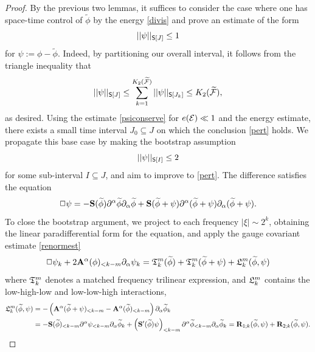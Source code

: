 \begin{proof}
	By the previous two lemmas, it suffices to consider the case where one has space-time control of $\widetilde \phi$ by the energy \eqref{divis} and prove an estimate of the form 
	\begin{equation}
		||\psi||_{\mathsf S[J]} \leq 1 \label{eq:pert}
	\end{equation}
	for $\psi := \phi - \widetilde \phi$. Indeed, by partitioning our overall interval, it follows from the triangle inequality that
		\[  
			||\psi||_{\mathsf S[J]} \leq \sum_{k = 1}^{K_2 (\widetilde {\mathcal F})} ||\psi||_{\mathsf S[J_k]} \leq K_2 (\widetilde {\mathcal F}),
		\]
	as desired. Using the estimate \eqref{psiconserve} for $e (\mathcal E) \ll 1$ and the energy estimate, there exists a small time interval $J_0 \subseteq J$ on which the conclusion \eqref{pert} holds. We propagate this base case by making the bootstrap assumption
		\begin{equation}
			||\psi||_{\mathsf S[I]} \leq 2
		\label{eq:pertBA}
		\end{equation}
	for some sub-interval $I \subseteq J$, and aim to improve to \eqref{pert}. The difference satisfies the equation
	\begin{equation}
		\Box \psi
			= - {\bf S} (\widetilde \phi) \partial^\alpha \widetilde \phi \partial_\alpha \widetilde \phi + {\bf S} (\widetilde \phi + \psi) \partial^\alpha( \widetilde \phi + \psi) \partial_\alpha (\widetilde \phi + \psi).
	\end{equation}
	To close the bootstrap argument, we project to each frequency $|\xi| \sim 2^k$, obtaining the linear paradifferential form for the equation, and apply the gauge covariant estimate \eqref{renormest}
		\begin{equation}
			\Box \psi_k + 2 {\bf A}^\alpha (\phi)_{< k - m} \partial_\alpha \psi_k = \mathfrak T^m_k (\widetilde \phi) + \mathfrak T^m_k (\widetilde \phi + \psi) + \mathfrak L^m_k (\widetilde \phi, \psi)
		\end{equation}
	where $\mathfrak T^m_k$ denotes a matched frequency trilinear expression, and $\mathfrak L^m_k$ contains the low-high-low and low-low-high interactions, 
		\begin{align*}
			\frL_k^m  (\widetilde \phi, \psi)
				&= - \left( \bfA^\alpha (\widetilde \phi + \psi)_{<k - m} - \bfA^\alpha (\widetilde \phi)_{< k - m} \right) \partial_\alpha \widetilde \phi_k \\
				&= -\bfS(\widetilde\phi)_{< k - m} \partial^\alpha \psi_{<k - m} \partial_\alpha \widetilde \phi_k + \left( \bfS' (\widetilde\phi) \psi \right)_{< k - m} \partial^\alpha \widetilde\phi_{<k - m} \partial_\alpha \widetilde\phi_k = \bfR_{1;k}  (\widetilde \phi, \psi)+ \bfR_{2;k} (\widetilde \phi, \psi).

\end{align*}
\end{proof}
